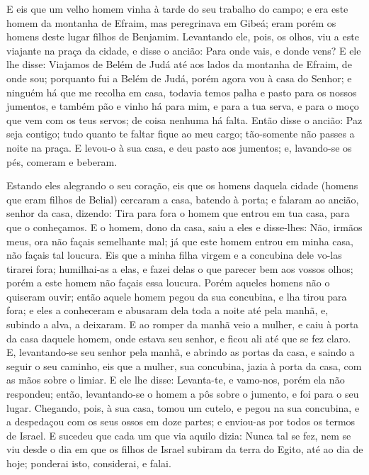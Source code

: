 E eis que um velho homem vinha à tarde do seu trabalho do campo;
e era este homem da montanha de Efraim, mas peregrinava em Gibeá;
eram porém os homens deste lugar filhos de Benjamim.
Levantando ele, pois, os olhos, viu a este viajante na praça
da cidade, e disse o ancião: Para onde vais, e donde vens? E
ele lhe disse: Viajamos de Belém de Judá até aos lados da montanha
de Efraim, de onde sou; porquanto fui a Belém de Judá, porém agora
vou à casa do Senhor; e ninguém há que me recolha em casa,
todavia temos palha e pasto para os nossos jumentos, e também
pão e vinho há para mim, e para a tua serva, e para o moço que vem
com os teus servos; de coisa nenhuma há falta. Então disse o
ancião: Paz seja contigo; tudo quanto te faltar fique ao meu cargo;
tão-somente não passes a noite na praça. E levou-o à sua
casa, e deu pasto aos jumentos; e, lavando-se os pés, comeram e
beberam.

Estando eles alegrando o seu coração, eis que os homens daquela
cidade (homens que eram filhos de Belial) cercaram a casa, batendo à
porta; e falaram ao ancião, senhor da casa, dizendo: Tira para fora
o homem que entrou em tua casa, para que o conheçamos. E o
homem, dono da casa, saiu a eles e disse-lhes: Não, irmãos meus, ora
não façais semelhante mal; já que este homem entrou em minha casa,
não façais tal loucura. Eis que a minha filha virgem e a
concubina dele vo-las tirarei fora; humilhai-as a elas, e fazei
delas o que parecer bem aos vossos olhos; porém a este homem não
façais essa loucura. Porém aqueles homens não o quiseram
ouvir; então aquele homem pegou da sua concubina, e lha tirou para
fora; e eles a conheceram e abusaram dela toda a noite até pela
manhã, e, subindo a alva, a deixaram. E ao romper da manhã
veio a mulher, e caiu à porta da casa daquele homem, onde estava seu
senhor, e ficou ali até que se fez claro. E, levantando-se
seu senhor pela manhã, e abrindo as portas da casa, e saindo a
seguir o seu caminho, eis que a mulher, sua concubina, jazia à porta
da casa, com as mãos sobre o limiar. E ele lhe disse:
Levanta-te, e vamo-nos, porém ela não respondeu; então,
levantando-se o homem a pôs sobre o jumento, e foi para o seu lugar.
Chegando, pois, à sua casa, tomou um cutelo, e pegou na sua
concubina, e a despedaçou com os seus ossos em doze partes; e
enviou-as por todos os termos de Israel. E sucedeu que cada
um que via aquilo dizia: Nunca tal se fez, nem se viu desde o dia em
que os filhos de Israel subiram da terra do Egito, até ao dia de
hoje; ponderai isto, considerai, e falai.

\medskip

